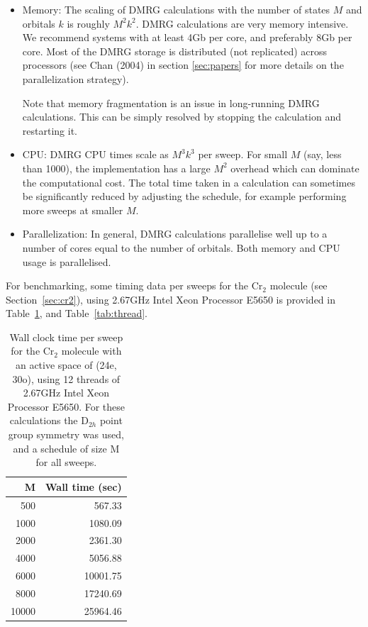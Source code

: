 \documentclass[letterpaper,12pt,aps, pra]{revtex4-1}
\begin{document}
\begin{itemize}
\item Memory: The scaling of DMRG calculations with the number of states $M$ and orbitals $k$ is roughly $M^2 k^2$.
DMRG calculations are very memory intensive. We recommend systems with at least 4Gb per core, and preferably 8Gb per core. Most
of the DMRG storage is distributed (not replicated) across processors (see Chan (2004) in section \ref{sec:papers} for more details
on the parallelization strategy).

Note that memory fragmentation is an issue in long-running DMRG calculations. This can be simply resolved by stopping the calculation and restarting it.
\item CPU: DMRG CPU times scale as $M^3 k^3$ per sweep. For small $M$ (say, less than 1000), the implementation has a
large $M^2$ overhead which can dominate the computational cost. The total time taken in a calculation can sometimes
be significantly reduced by adjusting the schedule, for example performing more sweeps at smaller $M$.
\item Parallelization: In general, DMRG calculations parallelise well up to a number of cores equal to the number of orbitals. Both
memory and CPU usage is parallelised.
\end{itemize}

For benchmarking, some timing data per sweeps for the Cr$_2$ molecule (see
Section~\ref{sec:cr2}), using 2.67GHz Intel Xeon Processor E5650 is provided in
Table~\ref{tab:timing}, and Table~\ref{tab:thread}.

\begin{table}
\begin{center}
\begin{tabular}{rr}
\hline
\hline
M& Wall time (sec)\\
\hline
500     &567.33\\
1000	&1080.09\\
2000	&2361.30\\
4000	&5056.88\\
6000	&10001.75\\
8000	&17240.69\\
10000	&25964.46\\
\hline
\hline
\end{tabular}
\end{center}
\caption{Wall clock time per sweep for the Cr$_2$ molecule with an active space
of (24e, 30o), using 12 threads of 2.67GHz Intel Xeon Processor E5650. For
these calculations the D$_{2h}$ point group symmetry was used, and a schedule
of size M for all sweeps.} \label{tab:timing}
\end{table}
\end{document}

